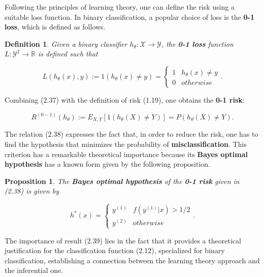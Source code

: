 \documentclass{report}
\newtheorem{definition}{Definition}[chapter]
\newtheorem{proposition}{Proposition}[chapter]
\begin{document}
Following the principles of learning theory, one can define the risk using a suitable loss function. In binary classification, a popular choice of loss is the \textbf{0-1 loss}, which is defined as follows.

\begin{definition}
Given a binary classifier $h_\theta : \mathcal{X} \to \mathcal{Y}$, the \textbf{0-1 loss} function $L : \mathcal{Y} ^ 2 \to \mathbb{R}$ is defined such that

\begin{equation}
L(h_\theta(x), y) := 1(h_\theta(x) \neq y) = \left\{\begin{matrix}
1 &  h_\theta(x) \neq y \\
0 & otherwise
\end{matrix}\right..
\end{equation}
\end{definition}

Combining (2.37) with the definition of risk (1.19), one obtains the \textbf{0-1 risk}:

\begin{equation}
R^{(0-1)}(h_\theta) := E_{X,Y}[1(h_\theta(X) \neq Y)] = P(h_\theta(X) \neq Y).
\end{equation}

The relation (2.38) expresses the fact that, in order to reduce the risk, one has to find the hypothesis that minimizes the probability of \textbf{misclassification}. This criterion has a remarkable theoretical importance because its \textbf{Bayes optimal hypothesis} has a known form given by the following proposition.

\begin{proposition}
The \textbf{Bayes optimal hypothesis} of the \textbf{0-1 risk} given in (2.38) is given by

\begin{equation}
h^*(x) = \left\{\begin{matrix}
y^{(1)} & f(y^{(1)}|x) > 1/2\\
y^{(2)} & otherwise
\end{matrix}\right..
\end{equation}
\end{proposition}

The importance of result (2.39) lies in the fact that it provides a theoretical justification for the classification function (2.12), specialized for binary classification, establishing a connection between the learning theory approach and the inferential one.
\end{document}

